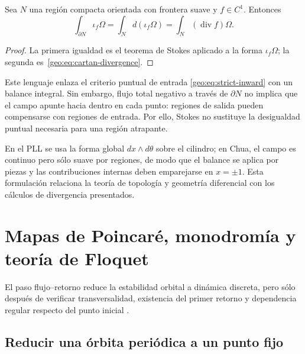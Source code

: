 \begin{proposition}
Sea \(N\) una región compacta orientada con frontera suave y \(f\in C^1\).
Entonces
\begin{equation}
 \int_{\partial N}\iota_f\Omega
 =\int_N d(\iota_f\Omega)
 =\int_N(\operatorname{div}f)\Omega.
 \label{geo:eq:stokes-flux}
\end{equation}
\end{proposition}

\begin{proof}
La primera igualdad es el teorema de Stokes aplicado a la forma
\(\iota_f\Omega\); la segunda es~\eqref{geo:eq:cartan-divergence}.
\end{proof}

Este lenguaje enlaza el criterio puntual de entrada
\eqref{geo:eq:strict-inward} con un balance integral. Sin embargo, flujo total
negativo a través de \(\partial N\) no implica que el campo apunte hacia
dentro en cada punto: regiones de salida pueden compensarse con regiones de
entrada. Por ello, Stokes no sustituye la desigualdad puntual necesaria para
una región atrapante.

En el PLL se usa la forma global \(dx\wedge d\theta\) sobre el cilindro; en
Chua, el campo es continuo pero sólo suave por regiones, de modo que el balance
se aplica por piezas y las contribuciones internas deben emparejarse en
\(x=\pm1\). Esta formulación relaciona la teoría de topología y geometría
diferencial con los cálculos de divergencia presentados.

\fi
\HAFOGeoRenderBlocktrue
\ifdefined\HAFOGeoBlockSelect
  \HAFOGeoRenderBlockfalse
  \ifdefined\HAFOGeoBlockPoincare\HAFOGeoRenderBlocktrue\fi
\fi
\ifHAFOGeoRenderBlock
\HAFOStudyNeedspace
\section{Mapas de Poincaré, monodromía y teoría de Floquet}
\label{sec:geo-poincare-floquet}

\HAFOCardPoincare

El paso flujo--retorno reduce la estabilidad orbital a dinámica discreta, pero
sólo después de verificar transversalidad, existencia del primer retorno y
dependencia regular respecto del punto inicial
\cite{JaurezEtAl2021TGEDII,HirschSmaleDevaney2013,Kuznetsov2023Bifurcation}.

\subsection{Reducir una órbita periódica a un punto fijo}

